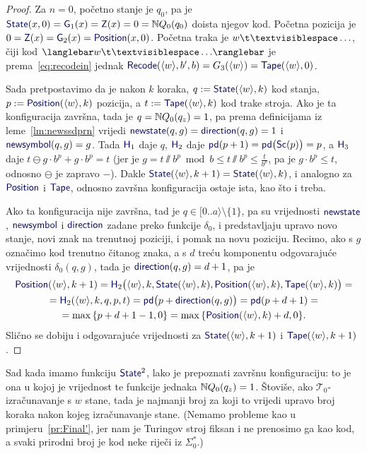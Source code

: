 \begin{proof}
Za $n=0$, početno stanje je $q_0$, pa je $\f{State}(x,0)=\f G_1(x)=\f Z(x)=0=\N Q_0(q_0)$ doista njegov kod. Početna pozicija je $0=\f Z(x)=\f G_2(x)=\f{Position}(x,0)$. Početna traka je $w\bl\ldots$, čiji kod $\knk{w\bl\ldots}$ je prema~\eqref{eq:recodein} jednak $\f{Recode}(\kr w,b',b)=G_3(\kr w)=\f{Tape}(\kr w,0)$.

Sada pretpostavimo da je nakon $k$ koraka, $q:=\f{State}(\kr w,k)$ kod stanja, $p:=\f{Position}(\kr w,k)$ pozicija, a $t:=\f{Tape}(\kr w,k)$ kod trake stroja. Ako je ta konfiguracija završna, tada je $q={\mathbb N} Q_0(q_z)=1$, pa prema definicijama iz leme~\ref{lm:newssdprn} vrijedi $\f{newstate}(q,g)=\f{direction}(q,g)=1$ i $\f{newsymbol}(q,g)=g$. Tada $\f H_1$ daje $q$, $\f H_2$ daje $\f{pd}(p+1)=\f{pd}\bigl(\f{Sc}(p)\bigr)=p$, a $\f H_3$ daje $t\ominus g\cdot b^p+g\cdot b^p=t$ (jer je $g=t\sslash b^p\bmod b\le t\sslash b^p\le\frac{t}{b^p}$, pa je $g\cdot b^p\le t$, odnosno $\ominus$ je zapravo $-$). Dakle $\f{State}(\kr w,k+1)=\f{State}(\kr w,k)$, i analogno za $\f{Position}$ i $\f{Tape}$, odnosno završna konfiguracija ostaje ista, kao što i treba.

Ako ta konfiguracija nije završna, tad je $q\in[0..a\rangle\setminus\{1\}$, pa su vrijednosti $\f{newstate}$, $\f{newsymbol}$ i $\f{direction}$ zadane preko funkcije $\delta_0$, i predstavljaju upravo novo stanje, novi znak na trenutnoj poziciji, i pomak na novu poziciju. Recimo, ako s $g$ označimo kod trenutno čitanog znaka, a s $d$ treću komponentu odgovarajuće vrijednosti $\delta_0(q,g)$, tada je $\f{direction}(q,g)=d+1$, pa je
\begin{multline}
    \f{Position}(\kr w,k+1)=\f H_2\bigl(\kr w,k,\f{State}(\kr w,k),\f{Position}(\kr w, k),\f{Tape}(\kr w,k)\bigr)=\\
    =\f H_2(\kr w,k,q,p,t)=
    \f{pd}\bigl(p+\f{direction}(q,g)\bigr)=\f{pd}(p+d+1)=\\
    =\max\,\{p+d+1-1,0\}=\max\,\{\f{Position}(\kr w,k)+d,0\}\text.
\end{multline}
Slično se dobiju i odgovarajuće vrijednosti za $\f{State}(\kr w,k+1)$ i $\f{Tape}(\kr w,k+1)$.
\end{proof}


Sad kada imamo funkciju $\f{State}^2$, lako je prepoznati završnu konfiguraciju: to je ona u kojoj je vrijednost te funkcije jednaka ${\mathbb N} Q_0(q_z)=1$. Štoviše, ako $\mathcal T_0$-izračunavanje s $w$ stane, tada je najmanji broj za koji to vrijedi upravo broj koraka nakon kojeg izračunavanje stane. (Nemamo probleme kao u primjeru~\ref{pr:Final'}, jer nam je Turingov stroj fiksan i ne prenosimo ga kao kod, a svaki prirodni broj je kod neke riječi iz $\Sigma_0^*$.)

